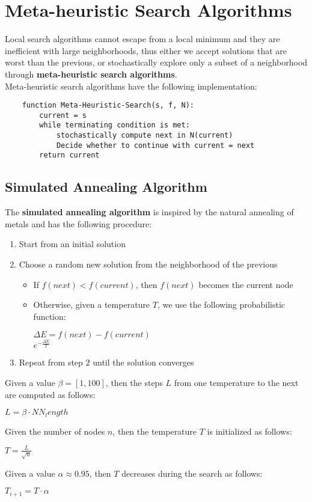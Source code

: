 \documentclass{article}
\begin{document}
\newpage

\section{Meta-heuristic Search Algorithms}
Local search algorithms cannot escape from a local minimum and they are inefficient with large neighborhoods, thus either we accept solutions that are worst than the previous, or stochastically explore only a subset of a neighborhood through \textbf{meta-heuristic search algorithms}. \\
Meta-heuristic search algorithms have the following implementation:
\begin{verbatim}
    function Meta-Heuristic-Search(s, f, N):
        current = s
        while terminating condition is met:
            stochastically compute next in N(current)
            Decide whether to continue with current = next
        return current
\end{verbatim}
\subsection{Simulated Annealing Algorithm}
The \textbf{simulated annealing algorithm} is inspired by the natural annealing of metals and has the following procedure:
\begin{enumerate}
    \item Start from an initial solution
    \item Choose a random new solution from the neighborhood of the previous
        \begin{itemize}
            \item If $f(next) < f(current)$, then $f(next)$ becomes the current node
            \item Otherwise, given a temperature $T$, we use the following probabilistic function:
                \begin{center}
                    $\Delta E = f(next) - f(current)$ \\
                    $e^{-\frac{\Delta E}{T}}$
                \end{center}
        \end{itemize}
    \item Repeat from step $2$ until the solution converges
\end{enumerate}
Given a value $\beta = [1, 100]$, then the steps $L$ from one temperature to the next are computed as follows:
\begin{center}
    $L=\beta \cdot NN_length$
\end{center}
Given the number of nodes $n$, then the temperature $T$ is initialized as follows:
\begin{center}
    $T = \displaystyle\frac{L}{\sqrt{n}}$
\end{center}
Given a value $\alpha \approx 0.95$, then $T$ decreases during the search as follows:
\begin{center}
    $T_{i + 1} = T \cdot \alpha$
\end{center}
\end{document}
